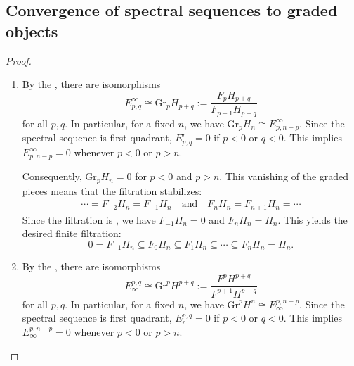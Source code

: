 \subsection{Convergence of spectral sequences to graded objects}







\begin{proof}
    \begin{enumerate}
        \item By the , there are isomorphisms
        $$E_{p,q}^\infty \cong \text{Gr}_p H_{p+q} := \frac{F_p H_{p+q}}{F_{p-1} H_{p+q}}$$
        for all $p,q$. In particular, for a fixed $n$, we have $\text{Gr}_p H_n \cong E_{p, n-p}^\infty$. Since the spectral sequence is first quadrant, $E_{p,q}^r = 0$ if $p < 0$ or $q < 0$. This implies $E_{p, n-p}^\infty = 0$ whenever $p < 0$ or $p > n$.

        Consequently, $\text{Gr}_p H_n = 0$ for $p < 0$ and $p > n$. This vanishing of the graded pieces means that the filtration stabilizes:
        \begin{align*}
            \cdots = F_{-2} H_n = F_{-1} H_n \quad \text{and} \quad F_n H_n = F_{n+1} H_n = \cdots
        \end{align*}
        Since the filtration is , we have $F_{-1} H_n = 0$ and $F_n H_n = H_n$. This yields the desired finite filtration:
        $$0 = F_{-1} H_n \subseteq F_0 H_n \subseteq F_1 H_n \subseteq \cdots \subseteq F_n H_n = H_n.$$

        \item By the , there are isomorphisms
        $$E_\infty^{p,q} \cong \text{Gr}^p H^{p+q} := \frac{F^p H^{p+q}}{F^{p+1} H^{p+q}}$$
        for all $p,q$. In particular, for a fixed $n$, we have $\text{Gr}^p H^n \cong E_\infty^{p, n-p}$. Since the spectral sequence is first quadrant, $E_r^{p,q} = 0$ if $p < 0$ or $q < 0$. This implies $E_\infty^{p, n-p} = 0$ whenever $p < 0$ or $p > n$.


\end{enumerate}
\end{proof}
